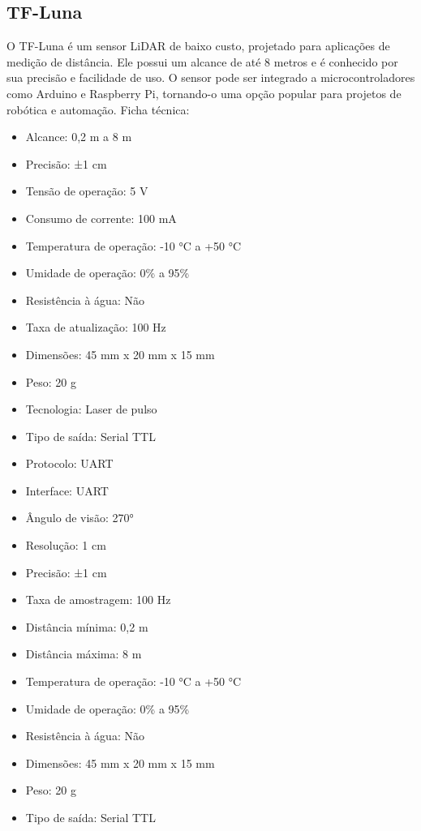 \subsection{TF-Luna}
O TF-Luna é um sensor LiDAR de baixo custo, projetado para aplicações de medição de distância. Ele possui um alcance de até 8 metros e é conhecido por sua precisão e facilidade de uso. O sensor pode ser integrado a microcontroladores como Arduino e Raspberry Pi, tornando-o uma opção popular para projetos de robótica e automação.
Ficha técnica:
\begin{itemize}
	\item Alcance: 0,2 m a 8 m
	\item Precisão: ±1 cm
	\item Tensão de operação: 5 V
	\item Consumo de corrente: 100 mA
	\item Temperatura de operação: -10 °C a +50 °C
	\item Umidade de operação: 0\% a 95\%
	\item Resistência à água: Não
	\item Taxa de atualização: 100 Hz
	\item Dimensões: 45 mm x 20 mm x 15 mm
	\item Peso: 20 g
	\item Tecnologia: Laser de pulso
	\item Tipo de saída: Serial TTL
	\item Protocolo: UART
	\item Interface: UART
	\item Ângulo de visão: 270°
	\item Resolução: 1 cm
	\item Precisão: ±1 cm
	\item Taxa de amostragem: 100 Hz
	\item Distância mínima: 0,2 m
	\item Distância máxima: 8 m
	\item Temperatura de operação: -10 °C a +50 °C
	\item Umidade de operação: 0\% a 95\%
	\item Resistência à água: Não	
	\item Dimensões: 45 mm x 20 mm x 15 mm
	\item Peso: 20 g
	\item Tipo de saída: Serial TTL
\end{itemize}
